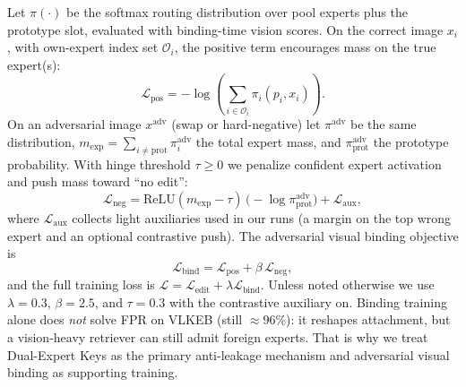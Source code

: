 \documentclass[letterpaper]{article} %
\begin{document}
Let $\pi(\cdot)$ be the softmax routing distribution over pool experts plus the prototype slot, evaluated with binding-time vision scores.
On the correct image $x_i$, with own-expert index set $\mathcal{O}_i$, the positive term encourages mass on the true expert(s):
\begin{equation}
\mathcal{L}_{\mathrm{pos}}
=
-\log\!\left(\sum_{i\in\mathcal{O}_i}\pi_i(p_i,x_i)\right).
\label{eq:avbt-pos}
\end{equation}
On an adversarial image $x^{\mathrm{adv}}$ (swap or hard-negative) let $\pi^{\mathrm{adv}}$ be the same distribution, $m_{\mathrm{exp}}=\sum_{i\neq\mathrm{prot}}\pi^{\mathrm{adv}}_i$ the total expert mass, and $\pi^{\mathrm{adv}}_{\mathrm{prot}}$ the prototype probability.
With hinge threshold $\tau\!\ge\!0$ we penalize confident expert activation and push mass toward ``no edit'':
\begin{equation}
\mathcal{L}_{\mathrm{neg}}
=
\mathrm{ReLU}\!\left(m_{\mathrm{exp}}-\tau\right)\,
\bigl(-\log\pi^{\mathrm{adv}}_{\mathrm{prot}}\bigr)
+
\mathcal{L}_{\mathrm{aux}},
\label{eq:avbt-neg}
\end{equation}
where $\mathcal{L}_{\mathrm{aux}}$ collects light auxiliaries used in our runs (a margin on the top wrong expert and an optional contrastive push).
The adversarial visual binding objective is
\begin{equation}
\mathcal{L}_{\mathrm{bind}}
=
\mathcal{L}_{\mathrm{pos}}
+
\beta\,\mathcal{L}_{\mathrm{neg}},
\label{eq:avbt}
\end{equation}
and the full training loss is $\mathcal{L}=\mathcal{L}_{\mathrm{edit}}+\lambda\mathcal{L}_{\mathrm{bind}}$.
Unless noted otherwise we use $\lambda{=}0.3$, $\beta{=}2.5$, and $\tau{=}0.3$ with the contrastive auxiliary on.
Binding training alone does \emph{not} solve FPR on VLKEB (still $\approx\!96\%$): it reshapes attachment, but a vision-heavy retriever can still admit foreign experts.
That is why we treat Dual-Expert Keys as the primary anti-leakage mechanism and adversarial visual binding as supporting training.


\end{document}
